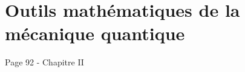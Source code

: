 \chapter{Outils mathématiques de la mécanique quantique}
\label{chapter:math_tools}
Page 92 - Chapitre II








